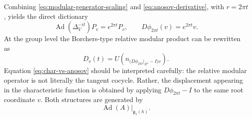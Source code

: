 \documentclass[11pt]{article}
\theoremstyle{definition}
\newcommand{\Ad}{\operatorname{Ad}}
\begin{document}
Combining \eqref{eq:modular-generator-scaling} and
\eqref{eq:anosov-derivative}, with \(r=2\pi t\), yields the direct dictionary
\begin{equation}
\Ad(\Delta_V^{-it})P_v=e^{2\pi t}P_v,
\qquad
D\phi_{2\pi t}(v)=e^{2\pi t}v.
\label{eq:dictionary}
\end{equation}
At the group level the Borchers-type relative modular product can be rewritten as
\begin{equation}
D_v(t)
=
U\!\left(
n_{\bigl(D\phi_{2\pi t}|_{E^u}-I\bigr)v}
\right).
\label{eq:char-vs-anosov}
\end{equation}
Equation \eqref{eq:char-vs-anosov} should be interpreted carefully: the relative modular
operator is not literally the tangent cocycle.  Rather, the displacement appearing in
the characteristic function is obtained by applying \(D\phi_{2\pi t}-I\) to the same
root coordinate \(v\).  Both structures are generated by
\[
\Ad(A)|_{\mathfrak g_1(h)}.
\]
\end{document}
